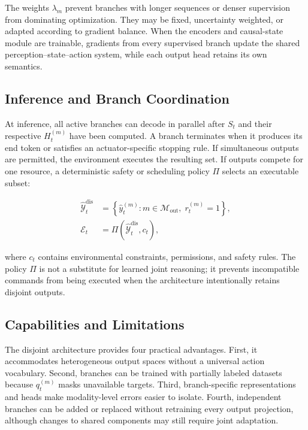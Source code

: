 The weights $\lambda_m$ prevent branches with longer sequences or denser supervision from dominating optimization. They may be fixed, uncertainty weighted, or adapted according to gradient balance. When the encoders and causal-state module are trainable, gradients from every supervised branch update the shared perception--state--action system, while each output head retains its own semantics.

\subsection{\textbf{Inference and Branch Coordination}}

At inference, all active branches can decode in parallel after $S_t$ and their respective $H_t^{(m)}$ have been computed. A branch terminates when it produces its end token or satisfies an actuator-specific stopping rule. If simultaneous outputs are permitted, the environment executes the resulting set. If outputs compete for one resource, a deterministic safety or scheduling policy $\Pi$ selects an executable subset:

\begin{equation}
\begin{aligned}
    \widehat{\mathcal{Y}}_t^{\mathrm{dis}}
    &= \left\{
       \widehat{y}_t^{(m)}:
       m\in\mathcal{M}_{\mathrm{out}},\;r_t^{(m)}=1
       \right\},\\
    \mathcal{E}_t
    &= \Pi\!\left(
       \widehat{\mathcal{Y}}_t^{\mathrm{dis}},c_t
       \right),
\end{aligned}
\label{eq:disjoint_execution}
\end{equation}

where $c_t$ contains environmental constraints, permissions, and safety rules. The policy $\Pi$ is not a substitute for learned joint reasoning; it prevents incompatible commands from being executed when the architecture intentionally retains disjoint outputs.

\subsection{\textbf{Capabilities and Limitations}}

The disjoint architecture provides four practical advantages. First, it accommodates heterogeneous output spaces without a universal action vocabulary. Second, branches can be trained with partially labeled datasets because $q_t^{(m)}$ masks unavailable targets. Third, branch-specific representations and heads make modality-level errors easier to isolate. Fourth, independent branches can be added or replaced without retraining every output projection, although changes to shared components may still require joint adaptation.


